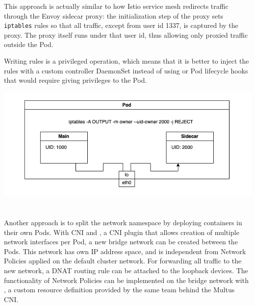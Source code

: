 \documentclass[portrait,a1,final]{a0poster}
\begin{document}
\begin{minipage}{\posterwidth}
\begin{minipage}[t]{\doublecolumnwidth}
    This approach is actually similar to how Istio service mesh redirects traffic through the Envoy sidecar proxy: the initialization step of the proxy sets \texttt{iptables} rules so that all traffic, except from user id 1337, is captured by the proxy. The proxy itself runs under that user id, thus allowing only proxied traffic outside the Pod.

    Writing  rules is a privileged operation, which means that it is better to inject the rules with a custom controller DaemonSet instead of using  or Pod lifecycle hooks that would require giving privileges to the Pod.

    \includegraphics[width=\linewidth]{figures/iptables.png}
  \end{minipage}
  \hspace{\columnspace}
  \begin{minipage}[t]{\doublecolumnwidth}
    \vspace{\sectionspace}
    \section*{}

    Another approach is to split the network namespace by deploying containers in their own Pods. With  CNI and , a CNI plugin that allows creation of multiple network interfaces per Pod, a new bridge network can be created between the Pods. This network has own IP address space, and is independent from Network Policies applied on the default cluster network. For forwarding all  traffic to the new network, a DNAT routing rule can be attached to the loopback devices. The functionality of Network Policies can be implemented on the bridge network with , a custom resource definition provided by the same team behind the Multus CNI.


\end{minipage}
\end{minipage}
\end{document}
